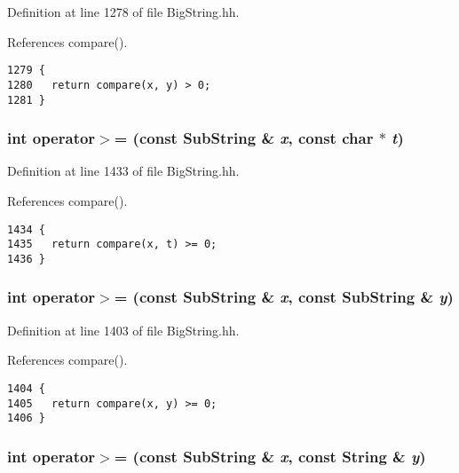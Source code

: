 Definition at line 1278 of file Big\-String.hh.

References compare().



\footnotesize\begin{verbatim}1279 {
1280   return compare(x, y) > 0; 
1281 }
\end{verbatim}\normalsize 
{}
\subsubsection{\setlength{\rightskip}{0pt plus 5cm}int operator$>$= (const {\bf Sub\-String} \& {\em x}, const char $\ast$ {\em t})\hspace{0.3cm}{\tt  [inline]}}\label{BigString_8hh_a119}




Definition at line 1433 of file Big\-String.hh.

References compare().



\footnotesize\begin{verbatim}1434 {
1435   return compare(x, t) >= 0; 
1436 }
\end{verbatim}\normalsize 
{}
\subsubsection{\setlength{\rightskip}{0pt plus 5cm}int operator$>$= (const {\bf Sub\-String} \& {\em x}, const {\bf Sub\-String} \& {\em y})\hspace{0.3cm}{\tt  [inline]}}\label{BigString_8hh_a113}




Definition at line 1403 of file Big\-String.hh.

References compare().



\footnotesize\begin{verbatim}1404 {
1405   return compare(x, y) >= 0;
1406 }
\end{verbatim}\normalsize 
{}
\subsubsection{\setlength{\rightskip}{0pt plus 5cm}int operator$>$= (const {\bf Sub\-String} \& {\em x}, const {\bf String} \& {\em y})\hspace{0.3cm}{\tt  [inline]}}\label{BigString_8hh_a107}




